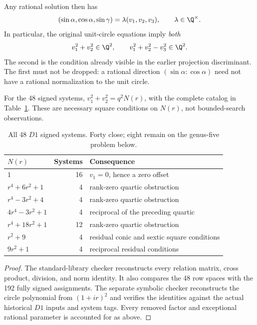 Any rational solution then has
\[
 (\sin\alpha,\cos\alpha,\sin\gamma)=\lambda(v_1,v_2,v_3),\qquad \lambda\in\Q^\times.
\]
In particular, the original unit-circle equations imply \emph{both}
\begin{equation}\label{eq:d1twonorms}
 v_1^2+v_2^2\in\Q^2,\qquad
 v_1^2+v_2^2-v_3^2\in\Q^2.
\end{equation}
The second is the condition already visible in the earlier projection discriminant. The first must not be dropped: a rational direction $(\sin\alpha:\cos\alpha)$ need not have a rational normalization to the unit circle.

\begin{lemma}\label{lem:d1catalog}
For the 48 signed systems, $v_1^2+v_2^2=q^2N(r)$, with the complete catalog in Table~\ref{tab:d1norms}. These are necessary square conditions on $N(r)$, not bounded-search observations.
\end{lemma}
\begin{table}[htbp]
\centering\small
\begin{tabular}{lrl}
\toprule
$N(r)$ & Systems & Consequence\\
\midrule
$1$ &16& $v_1=0$, hence a zero offset\\
$r^4+6r^2+1$ &4& rank-zero quartic obstruction\\
$r^4-3r^2+4$ &4& rank-zero quartic obstruction\\
$4r^4-3r^2+1$ &4& reciprocal of the preceding quartic\\
$r^4+18r^2+1$ &12& rank-zero quartic obstruction\\
$r^2+9$ &4& residual conic and sextic square conditions\\
$9r^2+1$ &4& reciprocal residual conditions\\
\bottomrule
\end{tabular}
\caption{All 48 $D1$ signed systems. Forty close; eight remain on the genus-five problem below.}\label{tab:d1norms}
\end{table}
\begin{proof}
The standard-library checker reconstructs every relation matrix, cross product, division, and norm identity. It also compares the 48 row spaces with the 192 fully signed assignments. The separate symbolic checker reconstructs the circle polynomial from $(1+ir)^2$ and verifies the identities against the actual historical $D1$ inputs and system tags. Every removed factor and exceptional rational parameter is accounted for as above.
\end{proof}


